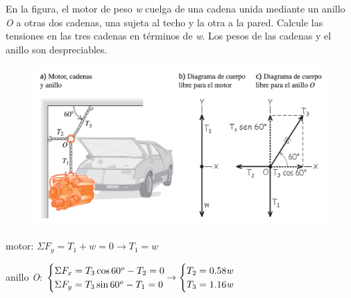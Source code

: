 \vspace{10mm} %
\begin{prob}
	En la figura, el motor de peso \textit{w} cuelga de una cadena unida mediante un anillo \textit{O} a otras dos cadenas, una sujeta al techo y la otra a la pared. Calcule las tensiones en las tres cadenas en términos de \textit{w}. Los pesos de las cadenas y el anillo son despreciables.
\end{prob}
	\begin{figure}[H]
	\centering
	\includegraphics[width=1\textwidth]{imagenes/imagenes03/T03IM38.png}
	\end{figure}

motor: $\Sigma F_y=T_1+\textit{w}=0 \to T_1=\textit{w}$

anillo \textit{O}: $\begin{cases}
\Sigma F_x=T_3 \cos 60^o-T_2=0 \\ \Sigma F_y=T_3 \sin 60^o-T_1=0	
\end{cases} \hspace{-4mm} \to  \begin{cases}
 T_2=0.58 \textit{w} \\ T_3=1.16 \textit{w}	
\end{cases}$


